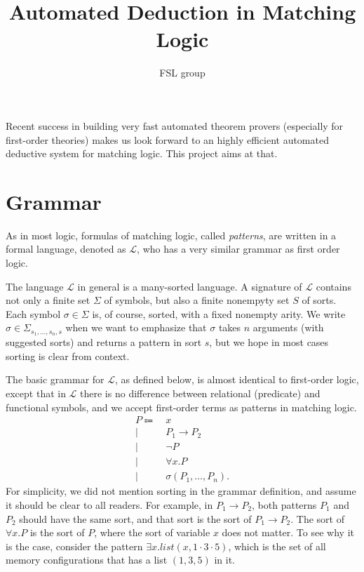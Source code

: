 \documentclass{article}
\title{Automated Deduction in Matching Logic}
\author{FSL group}
\theoremstyle{plain}
\begin{document}
\maketitle

Recent success in building very fast automated theorem provers (especially for first-order theories) makes us look forward to an highly efficient automated deductive system for matching logic. This project aims at that.

\section{Grammar}

As in most logic, formulas of matching logic, called \emph{patterns}, are written in a formal language, denoted as $\mathcal{L}$, who has a very similar grammar as first order logic. 

The language $\mathcal{L}$ in general is a many-sorted language. A signature of $\mathcal{L}$ contains not only a finite set $\Sigma$ of symbols, but also a finite nonempyty set $S$ of sorts. Each symbol $\sigma \in \Sigma$ is, of course, sorted, with a fixed nonempty arity. We write $\sigma \in \Sigma_{s_1,\dots,s_n,s}$ when we want to emphasize that $\sigma$ takes $n$ arguments (with suggested sorts) and returns a pattern in sort $s$, but we hope in most cases sorting is clear from context.

The basic grammar for $\mathcal{L}$, as defined below, is almost identical to first-order logic, except that in $\mathcal{L}$ there is no difference between relational (predicate) and functional symbols, and we accept first-order terms as patterns in matching logic. 
\begin{align*}
P \Coloneqq\  & x \\
       \mid\  & P_1 \to P_2 \\
       \mid\  & \neg P \\
       \mid\  & \forall x . P \\
       \mid\  & \sigma(P_1,\dots,P_n).
\end{align*}
For simplicity, we did not mention sorting in the grammar definition, and assume it should be clear to all readers. For example, in $P_1 \to P_2$, both patterns $P_1$ and $P_2$ should have the same sort, and that sort is the sort of $P_1 \to P_2$. The sort of $\forall x . P$ is the sort of $P$, where the sort of variable $x$ does not matter. To see why it is the case, consider the pattern $\exists x . list(x, 1 \cdot 3 \cdot 5)$, which is the set of all memory configurations that has a list $(1,3,5)$ in it.
\end{document}
